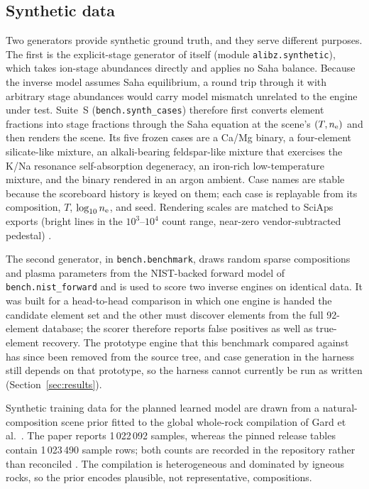 \subsection{Synthetic data}

Two generators provide synthetic ground truth, and they serve different purposes. The first is the explicit-stage generator of \alibz{} itself (module \texttt{alibz.synthetic}), which takes ion-stage abundances directly and applies no Saha balance. Because the inverse model assumes Saha equilibrium, a round trip through it with arbitrary stage abundances would carry model mismatch unrelated to the engine under test. Suite~S (\texttt{bench.synth\_cases}) therefore first converts element fractions into stage fractions through the Saha equation at the scene's $(T,n_{\mathrm{e}})$ and then renders the scene. Its five frozen cases are a Ca/Mg binary, a four-element silicate-like mixture, an alkali-bearing feldspar-like mixture that exercises the K/Na resonance self-absorption degeneracy, an iron-rich low-temperature mixture, and the binary rendered in an argon ambient. Case names are stable because the scoreboard history is keyed on them; each case is replayable from its composition, $T$, $\log_{10}n_{\mathrm{e}}$, and seed. Rendering scales are matched to SciAps exports (bright lines in the $10^3$--$10^4$ count range, near-zero vendor-subtracted pedestal) %
.

The second generator, in \texttt{bench.benchmark}, draws random sparse compositions and plasma parameters from the NIST-backed forward model of \texttt{bench.nist\_forward} and is used to score two inverse engines on identical data. It was built for a head-to-head comparison in which one engine is handed the candidate element set and the other must discover elements from the full 92-element database; the scorer therefore reports false positives as well as true-element recovery. The prototype engine that this benchmark compared against has since been removed from the source tree, and case generation in the harness still depends on that prototype, so the harness cannot currently be run as written (Section~\ref{sec:results}).

Synthetic training data for the planned learned model are drawn from a natural-composition scene prior fitted to the global whole-rock compilation of Gard et al.~\cite{gard2019wholerock}. The paper reports 1\,022\,092 samples, whereas the pinned release tables contain 1\,023\,490 sample rows; both counts are recorded in the repository rather than reconciled %
. The compilation is heterogeneous and dominated by igneous rocks, so the prior encodes plausible, not representative, compositions.

